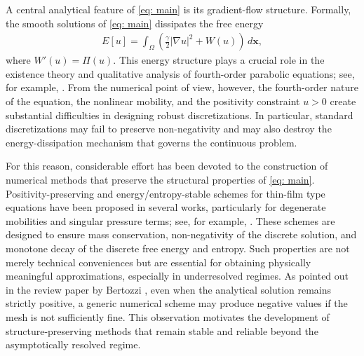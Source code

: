 \documentclass[11pt]{article}
\numberwithin{equation}{section}
\newtheorem{counter example}[theorem]{Counter Example}
\numberwithin{equation}{section}
\numberwithin{equation}{section}
\begin{document}
A central analytical feature of \eqref{eq: main} is its gradient-flow structure. Formally, the smooth solutions of \eqref{eq: main} dissipates the free energy
\begin{align}\label{limit_energy}
E[u] = \int_{\Omega} \left( \frac{\gamma}{2}|\nabla u|^2 + W(u) \right)\, d\mathbf{x},
\end{align}
where $W'(u)=\Pi(u)$. This energy structure plays a crucial role in the existence theory and qualitative analysis of fourth-order parabolic equations; see, for example, \cite{bernis1990higher,giacomelli1999fourth,giacomelli2014well,gnann2018navier,dai2016weak}. From the numerical point of view, however, the fourth-order nature of the equation, the nonlinear mobility, and the positivity constraint $u> 0$ create substantial difficulties in designing robust discretizations. In particular, standard discretizations may fail to preserve non-negativity and may also destroy the energy-dissipation mechanism that governs the continuous problem.

For this reason, considerable effort has been devoted to the construction of numerical methods that preserve the structural properties of \eqref{eq: main}. Positivity-preserving and energy/entropy-stable schemes for thin-film type equations have been proposed in several works, particularly for degenerate mobilities and singular pressure terms; see, for example, \cite{zhornitskaya1999positivity,grun2000nonnegativity, kim2024positivity}. These schemes are designed to ensure mass conservation, non-negativity of the discrete solution, and monotone decay of the discrete free energy and entropy. Such properties are not merely technical conveniences but are essential for obtaining physically meaningful approximations, especially in underresolved regimes. As pointed out in the review paper by Bertozzi \cite{bertozzi1998mathematics}, even when the analytical solution remains strictly positive, a generic numerical scheme may produce negative values if the mesh is not sufficiently fine. This observation motivates the development of structure-preserving methods that remain stable and reliable beyond the asymptotically resolved regime.
\end{document}

